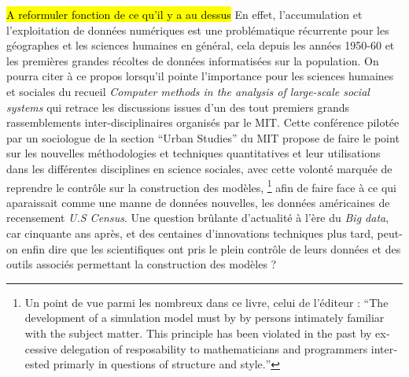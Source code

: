 \hl{A reformuler fonction de ce qu'il y a au dessus}
En effet, l'accumulation et l'exploitation de données numériques est une problématique récurrente pour les géographes et les sciences humaines en général, cela depuis les années 1950-60 \autocite{Kao1963, Hagerstrand1967b} \autocite[386]{Barnes2011} et les premières grandes récoltes de données informatisées sur la population. On pourra citer à ce propos \textcite{Gullahorn1966} lorsqu'il pointe l'importance pour les sciences humaines et sociales du recueil \textit{Computer methods in the analysis of large-scale social systems} qui retrace les discussions issues d'un des tout premiers grands rassemblements inter-disciplinaires organisés par le MIT. Cette conférence pilotée par un sociologue de la section \foreignquote{english}{Urban Studies} du MIT \autocite{Beshers1965} propose de faire le point sur les nouvelles méthodologies et techniques quantitatives et leur utilisations dans les différentes disciplines en science sociales, avec cette volonté marquée de reprendre le contrôle sur la construction des modèles, \footnote{Un point de vue parmi les nombreux dans ce livre, celui de l'éditeur \textcite[194]{Beshers1965} : \foreignquote{english}{The development of a simulation model must by by persons intimately familiar with the subject matter. This principle has been violated in the past by excessive delegation of resposability to mathematicians and programmers interested primarly in questions of structure and style.} } afin de faire face à ce qui aparaissait comme une manne de données nouvelles, les données américaines de recensement \textit{U.S Census}. Une question brûlante d'actualité à l'ère du \textit{Big data}, car cinquante ans après, et des centaines d'innovations techniques plus tard, peut-on enfin dire que les scientifiques ont pris le plein contrôle de leurs données et des outils associés permettant la construction des modèles ?

